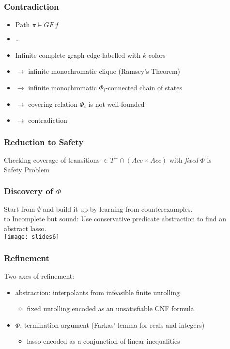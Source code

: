 \documentclass[d3s]{beamer}
\begin{document}
\begin{frame}
\frametitle{Contradiction}
\begin{itemize}
\itemsep=0.25cm
\item $\text{Path } \pi \models GF\ f$
\item \ldots
\item Infinite complete graph edge-labelled with $k$ colors
\itemsep=1cm
\item $\rightarrow$ infinite monochromatic clique (Ramsey's Theorem)
\itemsep=0.25cm
\item $\rightarrow$ infinite monochromatic $\Phi_i$-connected chain of states
\item $\rightarrow$ covering relation $\Phi_i$ is not well-founded
\item $\rightarrow$ contradiction
\end{itemize}
\end{frame}
\subtitleframe{}
\begin{frame}
\frametitle{Reduction to Safety}
Checking coverage of transitions $\in T^+ \cap (Acc \times Acc)$ with \emph{fixed} $\Phi$ is \\
\vskip1cm
\centering \Huge Safety Problem
\end{frame}
\begin{frame}
\frametitle{Discovery of $\Phi$}
Start from $\emptyset$ and build it up by learning from counterexamples. \\
\vskip0.5cm
\hbox to 
\vskip0.5cm
Incomplete but sound: Use conservative predicate abstraction to find an abstract lasso.\\
\vskip0.5cm
\centering\texttt{[image: slides6]}
\end{frame}
\begin{frame}
\frametitle{Refinement}
Two axes of refinement:
\begin{itemize}
\item abstraction: interpolants from infeasible finite unrolling
\begin{itemize}
\item fixed unrolling encoded as an unsatisfiable CNF formula
\end{itemize}
\item $\Phi$: termination argument (Farkas' lemma for reals and integers)
\begin{itemize}
\item lasso encoded as a conjunction of linear inequalities
\end{itemize}
\end{itemize}
\end{frame}
\end{document}
